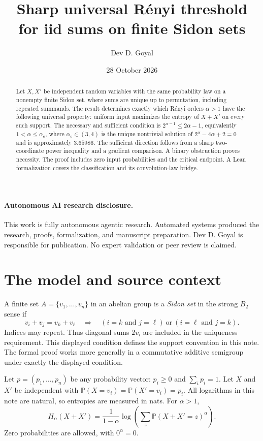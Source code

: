 \documentclass[11pt,a4paper]{article}
\title{Sharp universal R\'enyi threshold\\for iid sums on finite Sidon sets}
\author{Dev D. Goyal}
\date{28 October 2026}
\newcommand{\crit}{\alpha_{\mathrm c}}
\begin{document}
\maketitle

\paragraph{Autonomous AI research disclosure.}
This work is fully autonomous agentic research. Automated systems produced the research, proofs, formalization, and manuscript preparation. Dev D. Goyal is responsible for publication. No expert validation or peer review is claimed.


\begin{abstract}
Let $X,X'$ be independent random variables with the same probability law on a
nonempty finite Sidon set, where sums are unique up to permutation, including
repeated summands. The result determines exactly which R\'enyi orders $\alpha>1$ have
the following universal property: uniform input maximizes the entropy of
$X+X'$ on every such support. The necessary and sufficient condition is
$2^{\alpha-1}\le 2\alpha-1$, equivalently $1<\alpha\le\crit$, where
$\crit\in(3,4)$ is the unique nontrivial solution of
$2^\alpha-4\alpha+2=0$ and is approximately $3.65986$.
The sufficient direction follows from a sharp two-coordinate power inequality
and a gradient comparison. A binary obstruction proves necessity. The proof includes zero input probabilities and the critical endpoint.
A Lean formalization covers the classification and its convolution-law bridge.
\end{abstract}

\section{The model and source context}

A finite set $A=\{v_1,\ldots,v_n\}$ in an abelian group is a \emph{Sidon set}
in the strong $B_2$ sense if
\[
v_i+v_j=v_k+v_\ell
\quad\Longrightarrow\quad
(i=k\text{ and }j=\ell)\ \text{or}\ (i=\ell\text{ and }j=k).
\]
Indices may repeat. Thus diagonal sums $2v_i$ are included in the uniqueness
requirement. This displayed condition defines the support convention in this note.
The formal proof works more generally in a commutative additive semigroup
under exactly the displayed condition.

Let $p=(p_1,\ldots,p_n)$ be any probability vector:
$p_i\ge0$ and $\sum_i p_i=1$. Let $X$ and $X'$ be independent with
$\mathbb P(X=v_i)=\mathbb P(X'=v_i)=p_i$. All logarithms in this note are
natural, so entropies are measured in nats. For $\alpha>1$,
\[
H_\alpha(X+X')=
\frac{1}{1-\alpha}\log\!\left(\sum_z\mathbb P(X+X'=z)^\alpha\right).
\]
Zero probabilities are allowed, with $0^\alpha=0$.
\end{document}
